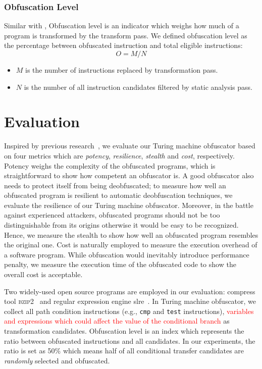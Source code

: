 \documentclass[lnicst]{svmultln}
\begin{document}
\subsubsection{Obfuscation Level}
Similar with \cite{Trans}, Obfuscation level is an indicator which weighs how much of a program is transformed by the transform pass. 
We defined obfuscation level as the percentage between obfuscated instruction and total eligible instructions:
\[ O = M / N \]
\begin{itemize}
  \item \(M\) is the number of instructions replaced by transformation pass.
  \item \(N\) is the number of all instruction candidates filtered by static analysis pass.
\end{itemize}

\section{Evaluation}
\label{sec:evaluation}
Inspired by previous research~\cite{Collberg, Ma}, we evaluate our Turing machine
obfuscator based on four metrics which are \textit{potency},
\textit{resilience}, \textit{stealth} and \textit{cost}, respectively. Potency
weighs the complexity of the obfuscated programs, which is straightforward to
show how competent an obfuscator is. A good obfuscator also needs to protect
itself from being deobfuscated; to measure how well an obfuscated program is
resilient to automatic deobfuscation techniques, we evaluate the resilience of
our Turing machine obfuscator. Moreover, in the battle against experienced attackers,
obfuscated programs should not be too distinguishable from its origins otherwise it would be easy to
be recognized. Hence, we measure the stealth to show how well an obfuscated
program resembles the original one. Cost is naturally employed to measure the
execution overhead of a software program. While obfuscation would inevitably
introduce performance penalty, we measure the execution time of the obfuscated
code to show the overall cost is acceptable.

Two widely-used open source programs are employed in our evaluation: compress
tool \textsc{bzip2}~\cite{bzip2} and regular expression engine slre~\cite{slre}.
In Turing machine obfuscator, we collect all path condition instructions (e.g.,
\texttt{cmp} and \texttt{test} instructions), \textcolor{red}{variables and
  expressions which could affect the value of the conditional branch} as
transformation candidates. Obfuscation level is an index which represents the
ratio between obfuscated instructions and all candidates. In our experiments,
the ratio is set as 50\% which means half of all conditional transfer candidates
are \textit{randomly} selected and obfuscated.
\end{document}
